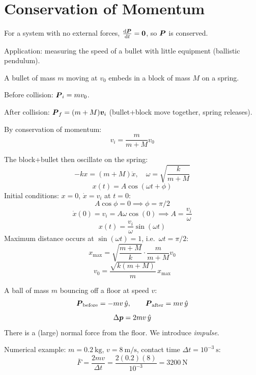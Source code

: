 \section{Conservation of Momentum}

\begin{theorem}
For a system with no external forces, $\dv{\vect{P}}{t} = \vect{0}$, so $\vect{P}$ is conserved.
\end{theorem}

Application: measuring the speed of a bullet with little equipment (ballistic pendulum).

\begin{example}
A bullet of mass $m$ moving at $v_0$ embeds in a block of mass $M$ on a spring.

Before collision: $\vect{P}_i = mv_0$.

After collision: $\vect{P}_f = (m+M)\lvect{v}_i$ (bullet+block move together, spring releases).

By conservation of momentum:
\[
    v_i = \frac{m}{m+M}v_0
\]

The block+bullet then oscillate on the spring:
\[
    -kx = (m+M)\ddot{x}, \quad \omega = \sqrt{\frac{k}{m+M}}
\]
\[
    x(t) = A\cos(\omega t + \phi)
\]
Initial conditions: $x = 0$, $\dot{x} = v_i$ at $t=0$:
\[
    A\cos\phi = 0 \implies \phi = \pi/2
\]
\[
    \dot{x}(0) = v_i = A\omega\cos(0) \implies A = \frac{v_i}{\omega}
\]
\[
    x(t) = \frac{v_i}{\omega}\sin(\omega t)
\]
Maximum distance occurs at $\sin(\omega t) = 1$, i.e.\ $\omega t = \pi/2$:
\[
    x_{\max} = \sqrt{\frac{m+M}{k}}\cdot\frac{m}{m+M}v_0
\]
\[
    v_0 = \frac{\sqrt{k(m+M)}}{m}\,x_{\max}
\]
\end{example}

\begin{example}
A ball of mass $m$ bouncing off a floor at speed $v$:
\[
    \vect{P}_{\text{before}} = -mv\,\hat{y}, \qquad \vect{P}_{\text{after}} = mv\,\hat{y}
\]
\[
    \Delta\bm{p} = 2mv\,\hat{y}
\]
There is a (large) normal force from the floor. We introduce \emph{impulse}.

Numerical example: $m = 0.2\ \text{kg}$, $v = 8\ \text{m/s}$, contact time $\Delta t = 10^{-3}\ \text{s}$:
\[
    \bar{F} = \frac{2mv}{\Delta t} = \frac{2(0.2)(8)}{10^{-3}} = 3200\ \text{N}
\]
\end{example}

